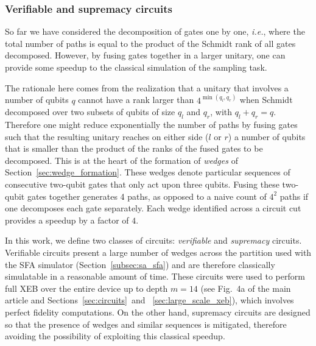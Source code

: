 \subsubsection{Verifiable and supremacy circuits}
\label{subsec:verifiable_and_supremacy}

So far we have considered the decomposition of gates one by one, \emph{i.e.}, where the total number of paths is equal to the product of the Schmidt rank of all gates decomposed. However, by fusing gates together in a larger unitary, one can provide some speedup to the classical simulation of the sampling task.

The rationale here comes from the realization that a unitary that involves a number of qubits $q$ cannot have a rank larger than $4^{\min(q_l, q_r)}$ when Schmidt decomposed  over two subsets of qubits of size $q_l$ and $q_r$, with $q_l+q_r=q$. Therefore one might reduce exponentially the number of paths by fusing gates such that the resulting unitary reaches on either side ($l$ or $r$) a number of qubits that is smaller than the product of the ranks of the fused gates to be decomposed. This is at the heart of the formation of \emph{wedges} of Section~\ref{sec:wedge_formation}. These wedges denote particular sequences of consecutive two-qubit gates that only act upon three qubits. Fusing these two-qubit gates together generates 4 paths, as opposed to a naive count of $4^2$ paths if one decomposes each gate separately. Each wedge identified across a circuit cut provides a speedup by a factor of $4$.

In this work, we define two classes of circuits: \emph{verifiable} and \emph{supremacy} circuits. Verifiable circuits present a large number of wedges across the partition used with the SFA simulator (Section~\ref{subsec:sa_sfa}) and are therefore classically simulatable in a reasonable amount of time. These circuits were used to perform full XEB over the entire device up to depth $m=14$ (see Fig.~4a of the main article and Sections~\ref{sec:circuits}~and~ \ref{sec:large_scale_xeb}), which involves perfect fidelity computations. On the other hand, supremacy circuits are designed so that the presence of wedges and similar sequences is mitigated, therefore avoiding the possibility of exploiting this classical speedup.

